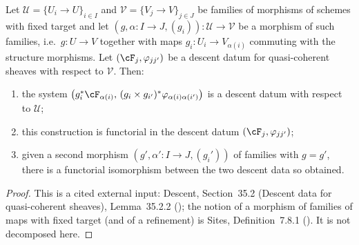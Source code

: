 \begin{lemma}
\label{lem:pc-descent-datum-refinement}
Let $\mathcal U=\{U_i\to U\}_{i\in I}$ and $\mathcal V=\{V_j\to V\}_{j\in J}$ be families of
morphisms of schemes with fixed target and let
$(g,\alpha:I\to J,(g_i)):\mathcal U\to\mathcal V$ be a morphism of such families, i.e.\
$g:U\to V$ together with maps $g_i:U_i\to V_{\alpha(i)}$ commuting with the structure
morphisms.  Let $(\cF_j,\varphi_{jj'})$ be a descent datum for quasi-coherent sheaves with
respect to $\mathcal V$.  Then:
\begin{enumerate}
\item the system
$\bigl(g_i^*\cF_{\alpha(i)},\,(g_i\times g_{i'})^*\varphi_{\alpha(i)\alpha(i')}\bigr)$
is a descent datum with respect to $\mathcal U$;
\item this construction is functorial in the descent datum $(\cF_j,\varphi_{jj'})$;
\item given a second morphism $(g',\alpha':I\to J,(g_i'))$ of families with $g=g'$, there is
a functorial isomorphism between the two descent data so obtained.
\end{enumerate}
\end{lemma}
\begin{proof}
This is a cited external input: Descent, Section~35.2 (Descent data for quasi-coherent
sheaves), Lemma~35.2.2 (\stacksproject{023C}); the notion of a morphism of families of maps
with fixed target (and of a refinement) is Sites, Definition~7.8.1
(\stacksproject{00VT}).  It is not decomposed here.
\end{proof}

